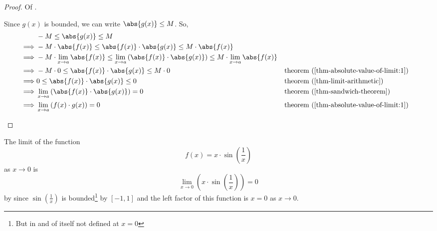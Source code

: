 \begin{proof}
	Of .
	\begin{flushleft}
		Since $g(x)$ is bounded, we can write $\abs{g(x)} \leq M$. So,
		\begin{align*}
			 & -M \leq \abs{g(x)} \leq M                                                                                                                                                                   \\
			\implies
			 & -M\cdot\abs{f(x)} \leq \abs{f(x)}\cdot\abs{g(x)} \leq M\cdot \abs{f(x)}                                                                                                                     \\
			\implies
			 & -M\cdot \lim_{x \to a}\abs{f(x)} \leq  \lim_{x \to a}\left(\abs{f(x)}\cdot\abs{g(x)}\right) \leq M \cdot \lim_{x \to a}\abs{f(x)}                                                           \\
			\implies
			 & -M \cdot 0 \leq \abs{f(x)}\cdot\abs{g(x)} \leq M \cdot 0                                                                          &  & \text{\pref{theorem}{thm-absolute-value-of-limit:1}} \\
			\implies
			 & 0 \leq \abs{f(x)}\cdot\abs{g(x)} \leq 0                                                                                           &  & \text{\pref{theorem}{thm-limit-arithmetic}}          \\
			\implies
			 & \lim_{x \to a}\left(\abs{f(x)}\cdot\abs{g(x)}\right)=0                                                                            &  & \text{\pref{theorem}{thm-sandwich-theorem}}          \\
			\implies
			 & \lim_{x \to a}\left(f(x)\cdot g(x)\right)=0                                                                                       &  & \text{\pref{theorem}{thm-absolute-value-of-limit:1}} \\
		\end{align*}
	\end{flushleft}
\end{proof}

\begin{exm}
	The limit of the function
	\begin{equation*}
		f(x) = x\cdot\sin\left(\frac{1}{x}\right)
	\end{equation*}
	as $x \to 0$ is
	\begin{equation*}
		\lim_{x \to 0}\left(x\cdot\sin\left(\frac{1}{x}\right)\right)=0
	\end{equation*}
	by  since $\sin\left(\tfrac{1}{x}\right)$
	is bounded\footnote{But in and of itself not defined at $x=0$} by $[-1,1]$
	and the left factor of this function is $x=0$ as $x \to 0$.
\end{exm}

